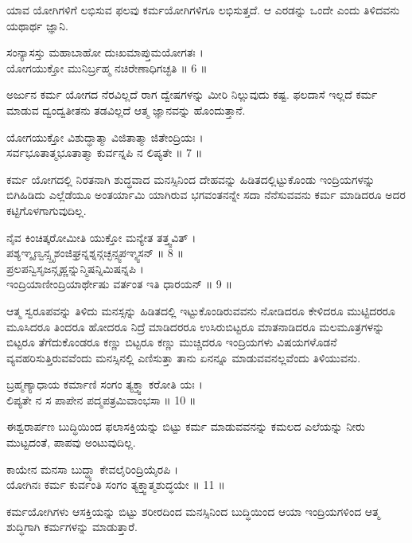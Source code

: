 \begin{quoting}
ಯಾವ ಯೋಗಿಗಳಿಗೆ ಲಭಿಸುವ ಫಲವು ಕರ್ಮಯೋಗಿಗಳಿಗೂ ಲಭಿಸುತ್ತದೆ. ಆ ಎರಡನ್ನು ಒಂದೇ ಎಂದು ತಿಳಿದವನು ಯಥಾರ್ಥ ಜ್ಞಾನಿ.\\
\end{quoting}
ಸಂನ್ಯಾಸಸ್ತು ಮಹಾಬಾಹೋ ದುಃಖಮಾಪ್ತುಮಯೋಗತಃ ।\\
ಯೋಗಯುಕ್ತೋ ಮುನಿರ್ಬ್ರಹ್ಮ ನಚಿರೇಣಾಧಿಗಚ್ಛತಿ ॥ 6 ॥
\begin{quoting}
ಅರ್ಜುನ ಕರ್ಮ ಯೋಗದ ನೆರವಿಲ್ಲದೆ ರಾಗ ದ್ವೇಷಗಳನ್ನು ಮೀರಿ ನಿಲ್ಲುವುದು ಕಷ್ಟ. ಫಲದಾಸೆ ಇಲ್ಲದೆ ಕರ್ಮ ಮಾಡುವ ದ್ವಂದ್ವತೀತನು ತಡವಿಲ್ಲದೆ ಆತ್ಮ ಜ್ಞಾನವನ್ನು ಹೊಂದುತ್ತಾನೆ.\\
\end{quoting}
ಯೋಗಯುಕ್ತೋ ವಿಶುದ್ಧಾತ್ಮಾ ವಿಜಿತಾತ್ಮಾ ಜಿತೇಂದ್ರಿಯಃ ।\\
ಸರ್ವಭೂತಾತ್ಮಭೂತಾತ್ಮಾ ಕುರ್ವನ್ನಪಿ ನ ಲಿಪ್ಯತೇ ॥ 7 ॥
\begin{quoting}
 ಕರ್ಮ ಯೋಗದಲ್ಲಿ ನಿರತನಾಗಿ ಶುದ್ಧವಾದ ಮನಸ್ಸಿನಿಂದ ದೇಹವನ್ನು ಹಿಡಿತದಲ್ಲಿಟ್ಟುಕೊಂಡು ಇಂದ್ರಿಯಗಳನ್ನು ಬಿಗಿಹಿಡಿದು ಎಲ್ಲೆಡೆಯೂ ಅಂತರ್ಯಾಮಿ ಯಾಗಿರುವ ಭಗವಂತನನ್ನೇ ಸದಾ ನೆನೆಸುವವನು ಕರ್ಮ ಮಾಡಿದರೂ ಅದರ ಕಟ್ಟಿಗೊಳಗಾಗುವುದಿಲ್ಲ.\\
\end{quoting}
ನೈವ ಕಿಂಚಿತ್ಕರೋಮೀತಿ ಯುಕ್ತೋ ಮನ್ಯೇತ ತತ್ತ್ವವಿತ್ ।\\
ಪಶ್ಯಞ್ಶೃಣ್ವನ್ಸ್ಪೃಶಂಜಿಘ್ರನ್ನಶ್ನನ್ಗಚ್ಛನ್ಸ್ವಪಞ್ಶ್ವಸನ್ ॥ 8 ॥\\
ಪ್ರಲಪನ್ವಿಸೃಜನ್ಗೃಹ್ಣನ್ನುನ್ಮಿಷನ್ನಿಮಿಷನ್ನಪಿ ।\\
ಇಂದ್ರಿಯಾಣೀಂದ್ರಿಯಾರ್ಥೇಷು ವರ್ತಂತ ಇತಿ ಧಾರಯನ್ ॥ 9 ॥
\begin{quoting}
ಆತ್ಮ ಸ್ವರೂಪವನ್ನು ತಿಳಿದು ಮನಸ್ಸನ್ನು ಹಿಡಿತದಲ್ಲಿ ಇಟ್ಟುಕೊಂಡಿರುವವನು ನೋಡಿದರೂ ಕೇಳಿದರೂ ಮುಟ್ಟಿದರರೂ ಮೂಸಿದರೂ ತಿಂದರೂ ಹೋದರೂ ನಿದ್ರೆ ಮಾಡಿದರರೂ ಉಸಿರುಬಿಟ್ಟರೂ ಮಾತನಾಡಿದರೂ ಮಲಮೂತ್ರಗಳನ್ನು ಬಿಟ್ಟರೂ ತೆಗೆದುಕೊಂಡರೂ ಕಣ್ಣು ಬಿಟ್ಟರೂ ಕಣ್ಣು ಮುಚ್ಚಿದರೂ ಇಂದ್ರಿಯಗಳು ವಿಷಯಗಳೊಡನೆ ವ್ಯವಹರಿಸುತ್ತಿರುವವೆಂದು ಮನಸ್ಸಿನಲ್ಲಿ ಎಣಿಸುತ್ತಾ ತಾನು ಏನನ್ನೂ ಮಾಡುವವನಲ್ಲವೆಂದು ತಿಳಿಯುವನು.\\
\end{quoting}
ಬ್ರಹ್ಮಣ್ಯಾಧಾಯ ಕರ್ಮಾಣಿ ಸಂಗಂ ತ್ಯಕ್ತ್ವಾ ಕರೋತಿ ಯಃ ।\\
ಲಿಪ್ಯತೇ ನ ಸ ಪಾಪೇನ ಪದ್ಮಪತ್ರಮಿವಾಂಭಸಾ ॥ 10 ॥
\begin{quoting}
ಈಶ್ವರಾರ್ಪಣ ಬುದ್ಧಿಯಿಂದ ಫಲಾಸಕ್ತಿಯನ್ನು ಬಿಟ್ಟು ಕರ್ಮ ಮಾಡುವವನನ್ನು ಕಮಲದ ಎಲೆಯನ್ನು ನೀರು  ಮುಟ್ಟದಂತೆ, ಪಾಪವು ಅಂಟುವುದಿಲ್ಲ.\\
\end{quoting}
ಕಾಯೇನ ಮನಸಾ ಬುದ್ಧ್ಯಾ ಕೇವಲೈರಿಂದ್ರಿಯೈರಪಿ ।\\
ಯೋಗಿನಃ ಕರ್ಮ ಕುರ್ವಂತಿ ಸಂಗಂ ತ್ಯಕ್ತ್ವಾತ್ಮಶುದ್ಧಯೇ ॥ 11 ॥
\begin{quoting}
ಕರ್ಮಯೋಗಿಗಳು ಆಸಕ್ತಿಯನ್ನು ಬಿಟ್ಟು ಶರೀರದಿಂದ ಮನಸ್ಸಿನಿಂದ ಬುದ್ಧಿಯಿಂದ ಆಯಾ ಇಂದ್ರಿಯಗಳಿಂದ ಆತ್ಮ ಶುದ್ಧಿಗಾಗಿ ಕರ್ಮಗಳನ್ನು ಮಾಡುತ್ತಾರೆ.\\
\end{quoting}
